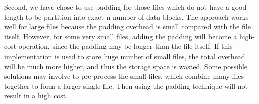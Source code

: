 Second, we have chose to use padding for those files which do not have a good length to be partition into exact n number of data blocks. The approach works well for large files because the padding overhead is small compared with the file itself. However, for some very small files, adding the padding will become a high-cost operation, since the padding may be longer than the file itself. If this implementation is used to store huge number of small files, the total overhead will be much more higher, and thus the storage space is wasted. Some possible solutions may involve to pre-process the small files, which combine many files together to form a larger single file. Then using the padding technique will not result in a high cost.